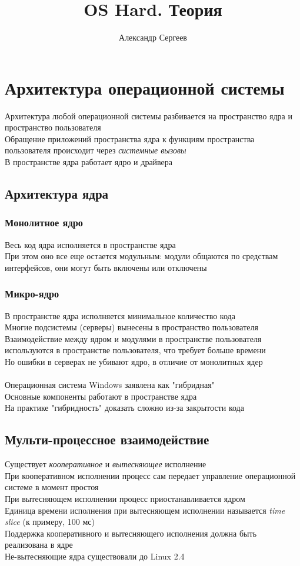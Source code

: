 \documentclass[12pt]{article}
\title{OS Hard. Теория}
\author{Александр Сергеев}
\date{}
\begin{document}
\maketitle
\section{Архитектура операционной системы}
Архитектура любой операционной системы разбивается на пространство ядра и пространство пользователя\\
Обращение приложений пространства ядра к функциям пространства пользователя происходит через \textit{системные вызовы}\\
В пространстве ядра работает ядро и драйвера\\
\subsection{Архитектура ядра}
\subsubsection{Монолитное ядро}
Весь код ядра исполняется в пространстве ядра\\
При этом оно все еще остается модульным: модули общаются по средствам интерфейсов, они могут быть включены или отключены
\subsubsection{Микро-ядро}
В пространстве ядра исполняется минимальное количество кода\\
Многие подсистемы (серверы) вынесены в пространство пользователя\\
Взаимодействие между ядром и модулями в пространстве пользователя используются в пространстве пользователя, что требует больше времени\\
Но ошибки в серверах не убивают ядро, в отличие от монолитных ядер\\\\
Операционная система Windows заявлена как "гибридная"\\
Основные компоненты работают в пространстве ядра\\
На практике "гибридность" доказать сложно из-за закрытости кода\\
\subsection{Мульти-процессное взаимодействие}
Существует \textit{кооперативное} и \textit{вытесняющее} исполнение\\
При кооперативном исполнении процесс сам передает управление операционной системе в момент простоя\\
При вытесняющем исполнении процесс приостанавливается ядром\\
Единица времени исполнения при вытесняющем исполнении называется \textit{time slice} (к примеру, 100 мс)\\
Поддержка кооперативного и вытесняющего исполнения должна быть реализована в ядре\\
Не-вытесняющие ядра существовали до Linux 2.4\\
\end{document}
